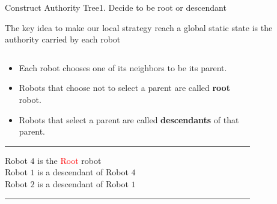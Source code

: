 \documentclass[10pt]{beamer}
\begin{document}
\begin{frame}{Construct Authority Tree}{1. Decide to be root or descendant}
  \begin{block}{The key idea to make our local strategy reach a global static
    state is the authority carried by each robot}
    \begin{columns}[T] %
      \begin{column}{.65\textwidth}
        \begin{itemize}
        \item Each robot chooses one of its neighbors to be its
          parent.
        \item Robots that choose not to select a parent are
          called \textbf{root} robot.
        \item Robots that select a parent are called
          \textbf{descendants} of that parent. 
        \end{itemize} 
        \hrule
        \begin{bclogo}[noborder=true, logo=\bccrayon]{} 
          Robot $4$ is the \textcolor{red}{Root} robot\\
          Robot $1$ is a descendant of Robot $4$\\
          Robot $2$ is a descendant of Robot $1$
        \end{bclogo}
        \hrule
      \end{column}%
      \begin{column}{.35\textwidth}
        \begin{figure}[center]
          \centering
        \end{figure} 
      \end{column}%
    \end{columns}
   \end{block} 
\end{frame}
\end{document}
